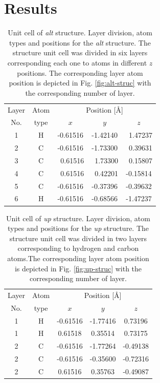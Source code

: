 \documentclass[prb,11pt,tightenlines,twocolumn,aps]{revtex4-1}
\begin{document}
\section{Results} %
\label{sec:results}

\begin{table}[t]
\center
\begin{tabular}{ccccc}\\
\hline
Layer & Atom & \multicolumn{3}{c}{Position [\AA]} \\
\cline{3-5}
No. & type & $x$ & $y$ & $z$  \\
\hline
1 & H &  -0.61516 &  -1.42140 & \ 1.47237 \\
2 & C &  -0.61516 &  -1.73300 & \ 0.39631 \\
3 & C & \ 0.61516 & \ 1.73300 & \ 0.15807 \\
4 & C & \ 0.61516 & \ 0.42201 &  -0.15814 \\
5 & C &  -0.61516 &  -0.37396 &  -0.39632 \\
6 & H &  -0.61516 &  -0.68566 &  -1.47237 \\
\hline
\end{tabular}
\caption{Unit cell of \emph{alt} structure. Layer division, atom types and
positions for the \emph{alt} structure. The structure unit cell was divided in
six layers corresponding each one to atoms in different $z$ positions. The
corresponding layer atom position is depicted in Fig. \ref{fig:alt-struc} with
the corresponding number of layer.}
\label{tab:alt-unitcell}
\end{table}
% 
\begin{table}[t]
\center
\begin{tabular}{ccccc}\\
\hline
Layer & Atom & \multicolumn{3}{c}{Position [\AA]} \\
\cline{3-5}
No. & type & $x$ & $y$ & $z$  \\
\hline
1 & H & -0.61516 & -1.77416 &  0.73196 \\
1 & H &  0.61518 &  0.35514 &  0.73175 \\
2 & C & -0.61516 & -1.77264 & -0.49138 \\
2 & C & -0.61516 & -0.35600 & -0.72316 \\
2 & C &  0.61516 &  0.35763 & -0.49087 \\
\hline
\end{tabular}
\caption{Unit cell of \emph{up} structure. Layer division, atom types and
positions for the \emph{up} structure. The structure unit cell was divided in
two layers corresponding to hydrogen and carbon atoms.The corresponding layer
atom position is depicted in Fig. \ref{fig:up-struc} with the corresponding
number of layer.}
\label{tab:up-unitcell}
\end{table}
\end{document}
